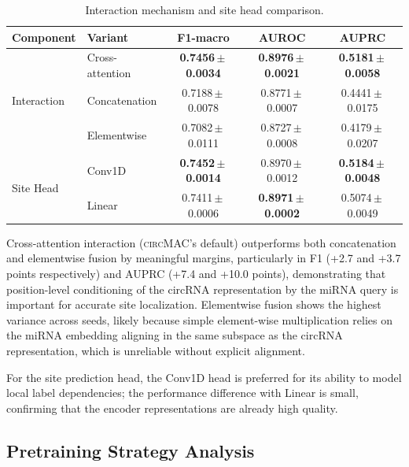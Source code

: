 \documentclass[11pt]{article}
\newcommand{\model}{\textsc{circMAC}}
\newcommand{\best}[1]{\textbf{#1}}
\newcommand{\spm}{\,\ensuremath{\pm}\,}
\begin{document}
\begin{table}[htbp]
\centering
\caption{Interaction mechanism and site head comparison.}
\label{tab:int_head}
\renewcommand{\arraystretch}{1.15}
\begin{tabular}{llccc}
\toprule
\textbf{Component} & \textbf{Variant} & \textbf{F1-macro} & \textbf{AUROC} & \textbf{AUPRC} \\
\midrule
\multirow{3}{*}{Interaction}
  & Cross-attention & \best{0.7456\spm 0.0034} & \best{0.8976\spm 0.0021} & \best{0.5181\spm 0.0058} \\
  & Concatenation   & 0.7188\spm 0.0078        & 0.8771\spm 0.0007        & 0.4441\spm 0.0175 \\
  & Elementwise     & 0.7082\spm 0.0111        & 0.8727\spm 0.0008        & 0.4179\spm 0.0207 \\
\midrule
\multirow{2}{*}{Site Head}
  & Conv1D          & \best{0.7452\spm 0.0014} & 0.8970\spm 0.0012        & \best{0.5184\spm 0.0048} \\
  & Linear          & 0.7411\spm 0.0006        & \best{0.8971\spm 0.0002} & 0.5074\spm 0.0049 \\
\bottomrule
\end{tabular}
\end{table}

Cross-attention interaction (\model{}'s default) outperforms both
concatenation and elementwise fusion by meaningful margins, particularly in
F1 (+2.7 and +3.7 points respectively) and AUPRC (+7.4 and +10.0 points),
demonstrating that position-level conditioning of the circRNA representation
by the miRNA query is important for accurate site localization.
Elementwise fusion shows the highest variance across seeds, likely because
simple element-wise multiplication relies on the miRNA embedding
aligning in the same subspace as the circRNA representation, which is
unreliable without explicit alignment.

For the site prediction head, the Conv1D head is preferred for its ability
to model local label dependencies; the performance difference with Linear is
small, confirming that the encoder representations are already high quality.


\subsection{Pretraining Strategy Analysis}
\end{document}
